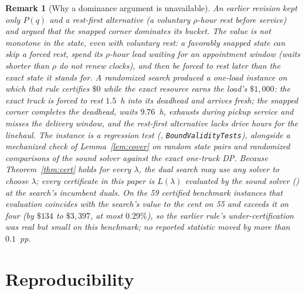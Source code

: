 \documentclass[11pt]{article}
\newtheorem{remark}{Remark}
\begin{document}
\begin{remark}[Why a dominance argument is unavailable]
\label{rem:cornerfail}
An earlier revision kept only $P(q)$ and a rest-first alternative
(a voluntary $\rho$-hour rest before service) and argued that the
snapped corner dominates its bucket. The value is not monotone in the
state, even with voluntary rest: a favorably snapped state can skip a
forced rest, spend its $\rho$-hour lead waiting for an appointment
window (waits shorter than $\rho$ do not renew clocks), and then be
forced to rest \emph{later} than the exact state it stands for. A
randomized search produced a one-load instance on which that rule
certifies $\$0$ while the exact resource earns the load's $\$1{,}000$:
the exact truck is forced to rest $1.5$~h into its deadhead and
arrives fresh; the snapped corner completes the deadhead, waits
$9.76$~h, exhausts during pickup service and misses the delivery
window, and the rest-first alternative lacks drive hours for the
linehaul. The instance is a regression test
(, \texttt{BoundValidityTests}),
alongside a mechanized check of Lemma~\ref{lem:cover} on random
state pairs and randomized comparisons of the sound solver against
the exact one-truck DP. Because Theorem~\ref{thm:cert} holds for
every $\lambda$, the dual search may use any solver to choose
$\lambda$; every certificate in this paper is $L(\lambda)$ evaluated
by the sound solver () at the search's
incumbent duals. On the 59 certified benchmark instances that
evaluation coincides with the search's value to the cent on 55 and
exceeds it on four (by $\$134$ to $\$3{,}397$, at most $0.29\%$), so
the earlier rule's under-certification was real but small on this
benchmark; no reported statistic moved by more than $0.1$~pp.
\end{remark}

\section{Reproducibility}
\label{sec:repro}
\end{document}
